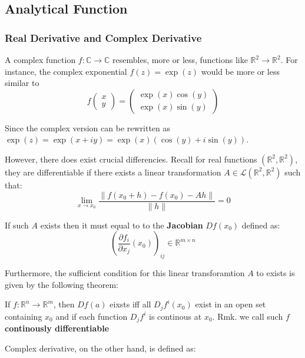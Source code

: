 \subsection{Analytical Function}

%
\providecommand{\argmin}{\operatorname*{arg\,min}}%
\providecommand{\argmax}{\operatorname*{arg\,max}}%
\subsubsection{Real Derivative and Complex Derivative}

A complex function $f:\mathbb{C}\to \mathbb{C}$ resembles, more or less, functions like $\mathbb{R}^2\to \mathbb{R}^2$. For instance, the complex exponential $f(z)=\exp(z)$ would be more or less similar to
\begin{equation}
f\begin{pmatrix}
        x \\
        y
    \end{pmatrix} = 
    \begin{pmatrix}
        \exp(x)\cos(y) \\
        \exp(x)\sin(y)
    \end{pmatrix}
\end{equation}

Since the complex version can be rewritten as $\exp(z)=\exp(x+iy)=\exp(x)(\cos(y) + i\sin(y))$.

However, there does exist crucial differencies. Recall for real functions $(\mathbb{R}^2, \mathbb{R}^2)$, they are differentiable if there exists a linear transformation $A\in \mathcal L (\mathbb{R}^2, \mathbb{R}^2)$ such that:
\begin{equation}
\lim_{x\to x_0} \frac{\|f(x_0+h)-f(x_0) - Ah\|}{\|h\|}=0
\end{equation}

If such $A$ exists then it must equal to to the \textbf{Jacobian} $Df(x_0)$ defined as:
\begin{equation}
\left(\frac{\partial f_i}{\partial x_j}(x_0)\right)_{ij} \in \mathbb{R}^{m\times n}
\end{equation}

Furthermore, the sufficient condition for this linear transforamtion $A$ to exists is given by the following theorem:

\begin{theorem}If $f:\mathbb{R}^n\to \mathbb{R}^m$, then $Df(a)$ eixsts iff all $D_jf^{i}(x_0)$ exist in an open set containing $x_0$ and if each function $D_jf^i$ is continous at $x_0$.
Rmk. we call such $f$ \textbf{continously differentiable}

\end{theorem}Complex derivative, on the other hand, is defined as:

